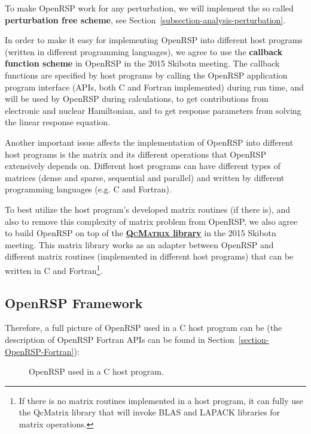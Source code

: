 To make OpenRSP work for any perturbation, we will implement the so called
\textbf{perturbation free scheme}, see Section~\ref{subsection-analysis-perturbation}.

In order to make it easy for implementing OpenRSP into different host programs
(written in different programming languages), we agree to use the
\textbf{callback function scheme} in OpenRSP
in the 2015 Skibotn meeting. The callback functions are specified by host
programs by calling the OpenRSP application program interface (APIs, both C
and Fortran implemented) during run time, and will be used by OpenRSP during
calculations, to get contributions from electronic and nuclear Hamiltonian, and
to get response parameters from solving the linear response equation.

Another important issue affects the implementation of OpenRSP into different
host programs is the matrix and its different operations that OpenRSP
extensively depends on. Different host programs can have different types of
matrices (dense and sparse, sequential and parallel) and written by different
programming languages (e.g. C and Fortran).

To best utilize the host program's developed matrix routines (if there is), and
also to remove this complexity of matrix problem from OpenRSP, we also agree
to build OpenRSP on top of the
\href{https://gitlab.com/bingao/qcmatrix}{\textbf{\textsc{QcMatrix} library}}
in the 2015 Skibotn meeting. This matrix library works as an adapter between
OpenRSP and different matrix routines (implemented in different host programs)
that can be written in C and Fortran\footnote{If there is no matrix routines
implemented in a host program, it can fully use the QcMatrix library that will
invoke BLAS and LAPACK libraries for matrix operations.}.

\subsection{OpenRSP Framework}

Therefore, a full picture of OpenRSP used in a C host program can be (the
description of OpenRSP Fortran APIs can be found in
Section~\ref{section-OpenRSP-Fortran}):

\begin{figure}[hbt]
  \centering
  \scalebox{0.7}{}
  \caption{OpenRSP used in a C host program.}
  \label{fig-openrsp-framework}
\end{figure}

